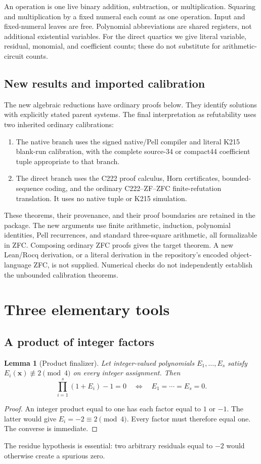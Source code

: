 \documentclass[11pt]{article}
\newtheorem{lemma}[theorem]{Lemma}
\theoremstyle{remark}\newtheorem{remark}[theorem]{Remark}
\begin{document}
An operation is one live binary addition, subtraction, or multiplication.
Squaring and multiplication by a fixed numeral each count as one operation.
Input and fixed-numeral leaves are free. Polynomial abbreviations are
shared registers, not additional existential variables. For the direct
quartics we give literal variable, residual, monomial, and coefficient
counts; these do not substitute for arithmetic-circuit counts.

\subsection{New results and imported calibration}
The new algebraic reductions have ordinary proofs below. They identify
solutions with explicitly stated parent systems. The final interpretation
as refutability uses two inherited ordinary calibrations:
\begin{enumerate}[leftmargin=*]
\item The native branch uses the signed native/Pell compiler and literal
K215 blank-run calibration, with the complete source-34 or compact44
coefficient tuple appropriate to that branch.
\item The direct branch uses the C222 proof calculus, Horn certificates,
bounded-sequence coding, and the ordinary C222--ZF--ZFC finite-refutation
translation. It uses no native tuple or K215 simulation.
\end{enumerate}
These theorems, their provenance, and their proof boundaries are retained
in the package. The new arguments use finite arithmetic, induction,
polynomial identities, Pell recurrences, and standard three-square
arithmetic, all formalizable in ZFC. Composing ordinary ZFC proofs gives
the target theorem. A new Lean/Rocq derivation, or a literal derivation in
the repository's encoded object-language ZFC, is not supplied. Numerical
checks do not independently establish the unbounded calibration theorems.

\section{Three elementary tools}
\subsection{A product of integer factors}
\begin{lemma}[Product finalizer]\label{lem:units}
Let integer-valued polynomials $E_1,\ldots,E_s$ satisfy
$E_i(\boldsymbol{x})\not\equiv2\pmod4$ on every integer assignment. Then
\[
 \prod_{i=1}^s(1+E_i)-1=0
 \quad\Longleftrightarrow\quad E_1=\cdots=E_s=0.
\]
\end{lemma}
\begin{proof}
An integer product equal to one has each factor equal to $1$ or $-1$.
The latter would give $E_i=-2\equiv2\pmod4$. Every factor must therefore
equal one. The converse is immediate.
\end{proof}
The residue hypothesis is essential: two arbitrary residuals equal to
$-2$ would otherwise create a spurious zero.
\end{document}
